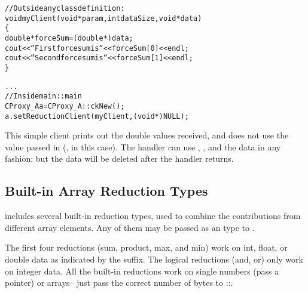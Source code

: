 \begin{alltt}
//Outside any class definition:
void myClient(void *param,int dataSize,void *data)
\{
  double *forceSum=(double *)data;
  cout<<``First force sum is ``<<forceSum[0]<<endl;
  cout<<``Second force sum is ``<<forceSum[1]<<endl;
\}

...
    //Inside main::main
    CProxy_A a=CProxy_A::ckNew();
    a.setReductionClient(myClient,(void *)NULL);
\end{alltt}

This simple client prints out the double values received, and does not
use the  value passed in (, in this case).  The
handler can use , , and the data in any
fashion; but the data will be deleted after the handler returns.


\subsection{Built-in Array Reduction Types}

\charmpp{} includes several built-in reduction types, used to combine the
contributions from different array elements.  Any of them may be passed as an
 type to .

The first four reductions (sum, product, max, and min) work on int,
float, or double data as indicated by the suffix.  The logical
reductions (and, or) only work on integer data.  All the built-in
reductions work on single numbers (pass a pointer) or arrays-- just
pass the correct number of bytes to
::.

